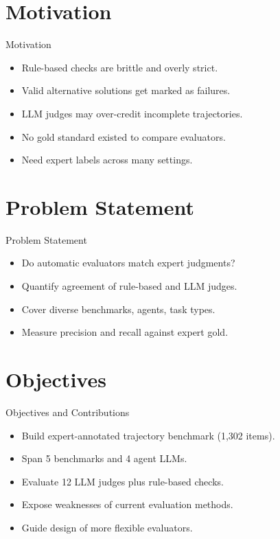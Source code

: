 \documentclass{beamer}
\begin{document}
\section{Motivation}
\begin{frame}{Motivation}
\begin{itemize}
\item Rule-based checks are brittle and overly strict.
\item Valid alternative solutions get marked as failures.
\item LLM judges may over-credit incomplete trajectories.
\item No gold standard existed to compare evaluators.
\item Need expert labels across many settings.
\end{itemize}
\end{frame}

\section{Problem Statement}
\begin{frame}{Problem Statement}
\begin{itemize}
\item Do automatic evaluators match expert judgments?
\item Quantify agreement of rule-based and LLM judges.
\item Cover diverse benchmarks, agents, task types.
\item Measure precision and recall against expert gold.
\end{itemize}
\end{frame}

\section{Objectives}
\begin{frame}{Objectives and Contributions}
\begin{itemize}
\item Build expert-annotated trajectory benchmark (1,302 items).
\item Span 5 benchmarks and 4 agent LLMs.
\item Evaluate 12 LLM judges plus rule-based checks.
\item Expose weaknesses of current evaluation methods.
\item Guide design of more flexible evaluators.
\end{itemize}
\end{frame}
\end{document}
